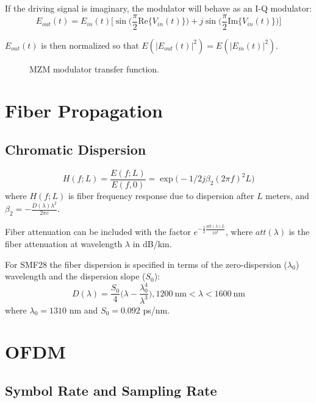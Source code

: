 \documentclass[a4paper]{article}
\begin{document}
If the driving signal is imaginary, the modulator will behave as an I-Q modulator:
\begin{equation}
E_{out}(t) = E_{in}(t)\Big[\sin\Big(\frac{\pi}{2}\mathrm{Re}\{V_{in}(t)\}\Big) + j\sin\Big(\frac{\pi}{2}\mathrm{Im}\{V_{in}(t)\}\Big)\Big]
\end{equation}

$E_{out}(t)$ is then normalized so that $E(|E_{out}(t)|^2) = E(|E_{in}(t)|^2)$.

\FloatBarrier
\begin{figure}[h!]
	\centering
	\resizebox{\linewidth}{!}{}
	\caption{MZM modulator transfer function.}
\end{figure}
\FloatBarrier

\section{Fiber Propagation}
\subsection{Chromatic Dispersion}
\begin{equation} \label{eq:Hdisp}
H(f; L) = \frac{E(f; L)}{E(f, 0)} = \exp\Big(-1/2j\beta_2(2\pi f)^2L\Big)
\end{equation}
where $H(f; L)$ is fiber frequency response due to dispersion after $L$ meters, and $\beta_2 = -\frac{D(\lambda)\lambda^2}{2\pi c}$. 

Fiber attenuation can be included with the factor $e^{-\frac{1}{2}\frac{att(\lambda)L}{10^4}}$, where $att(\lambda)$ is the fiber attenuation at wavelength $\lambda$ in dB/km.

For SMF28 the fiber dispersion is specified in terms of the zero-dispersion ($\lambda_0$) wavelength and the dispersion slope ($S_0$):
\begin{equation}
D(\lambda) = \frac{S_0}{4}\bigg(\lambda - \frac{\lambda_0^4}{\lambda^3}\bigg), 1200~\text{nm} < \lambda < 1600~\text{nm}
\end{equation}
where $\lambda_0 = 1310$ nm and $S_0 = 0.092$ ps/nm.

\section{OFDM}

\subsection{Symbol Rate and Sampling Rate}
\end{document}
